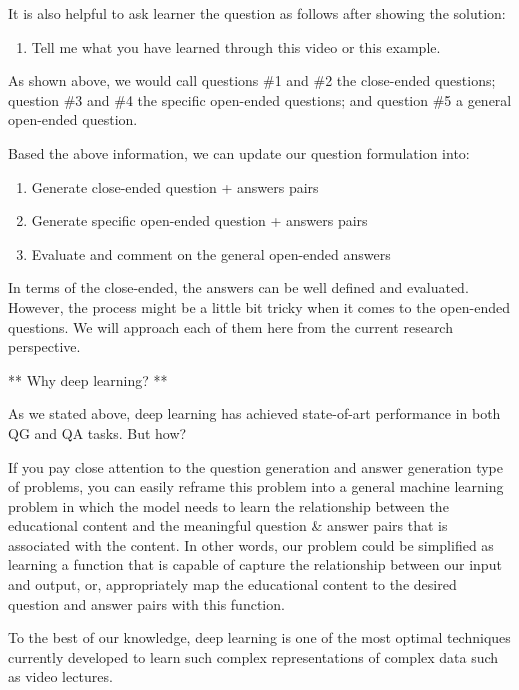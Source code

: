 \documentclass[]{book}
\providecommand{\tightlist}{%
  \setlength{\itemsep}{0pt}\setlength{\parskip}{0pt}}
\theoremstyle{definition}
\theoremstyle{definition}
\theoremstyle{definition}
\theoremstyle{remark}
\begin{document}
It is also helpful to ask learner the question as follows after showing
the solution:

\begin{enumerate}
\def\labelenumi{\arabic{enumi}.}
\setcounter{enumi}{4}
\tightlist
\item
  Tell me what you have learned through this video or this example.
\end{enumerate}

As shown above, we would call questions \#1 and \#2 the close-ended
questions; question \#3 and \#4 the specific open-ended questions; and
question \#5 a general open-ended question.

Based the above information, we can update our question formulation
into:

\begin{enumerate}
\def\labelenumi{\arabic{enumi}.}
\item
  Generate close-ended question + answers pairs
\item
  Generate specific open-ended question + answers pairs
\item
  Evaluate and comment on the general open-ended answers
\end{enumerate}

In terms of the close-ended, the answers can be well defined and
evaluated. However, the process might be a little bit tricky when it
comes to the open-ended questions. We will approach each of them here
from the current research perspective.

** Why deep learning? **

As we stated above, deep learning has achieved state-of-art performance
in both QG and QA tasks. But how?

If you pay close attention to the question generation and answer
generation type of problems, you can easily reframe this problem into a
general machine learning problem in which the model needs to learn the
relationship between the educational content and the meaningful question
\& answer pairs that is associated with the content. In other words, our
problem could be simplified as learning a function that is capable of
capture the relationship between our input and output, or, appropriately
map the educational content to the desired question and answer pairs
with this function.

To the best of our knowledge, deep learning is one of the most optimal
techniques currently developed to learn such complex representations of
complex data such as video lectures.
\end{document}
